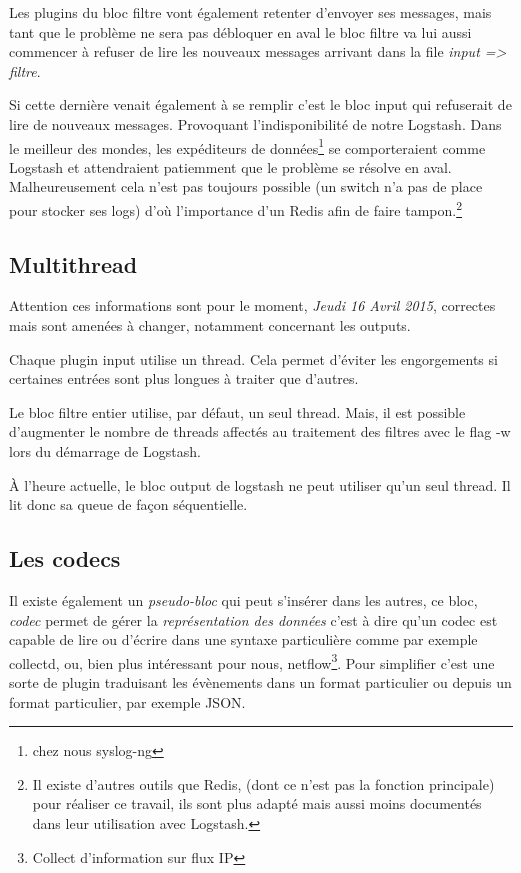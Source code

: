 Les plugins du bloc filtre vont également retenter d'envoyer ses messages, mais tant
que le problème ne sera pas débloquer en aval le bloc filtre va lui aussi commencer
à refuser de lire les nouveaux messages arrivant dans la file \textit{input => filtre}.

Si cette dernière venait également à se remplir c'est le bloc input qui refuserait
de lire de nouveaux messages. Provoquant l'indisponibilité de notre Logstash.
Dans le meilleur des mondes, les expéditeurs de données\footnote{chez nous syslog-ng} 
se comporteraient comme Logstash et attendraient patiemment que le problème se résolve 
en aval. Malheureusement cela n'est pas toujours possible (un switch n'a pas de place 
pour stocker ses logs) d'où l'importance d'un Redis afin de faire tampon.\footnote{Il 
existe d'autres outils que Redis, (dont ce n'est pas la fonction
principale) pour réaliser ce travail, ils sont plus adapté mais aussi moins documentés
dans leur utilisation avec Logstash.}

\subsection{Multithread}
\label{subsec:logstashmultithread}
{\footnotesize Attention ces informations sont pour le moment, \textit{Jeudi 16 Avril 2015}, correctes 
mais sont amenées à changer, notamment concernant les outputs.}

Chaque plugin input utilise un \gls{thread}. Cela permet d'éviter les engorgements si  
certaines entrées sont plus longues à traiter que d'autres.

Le bloc filtre entier utilise, par défaut, un seul thread. Mais, il est possible 
d'augmenter le nombre de threads affectés au traitement des filtres avec le \gls{flag}
-w lors du démarrage de Logstash.

À l'heure actuelle, le bloc output de logstash ne peut utiliser qu'un seul thread.
Il lit donc sa queue de façon séquentielle. 
\subsection{Les codecs}
\label{subsec:logstashcodec}
Il existe également un \textit{pseudo-bloc} qui peut s'insérer dans les autres, ce 
bloc, \emph{codec} permet de gérer la \textit{représentation des données} c'est 
à dire qu'un codec est capable de lire ou d'écrire dans une syntaxe particulière 
comme par exemple collectd, ou, bien plus intéressant pour nous, netflow\footnote{Collect d'information sur flux IP }. Pour simplifier c'est une sorte de plugin traduisant les évènements dans un format particulier ou depuis un format particulier, par exemple JSON.

